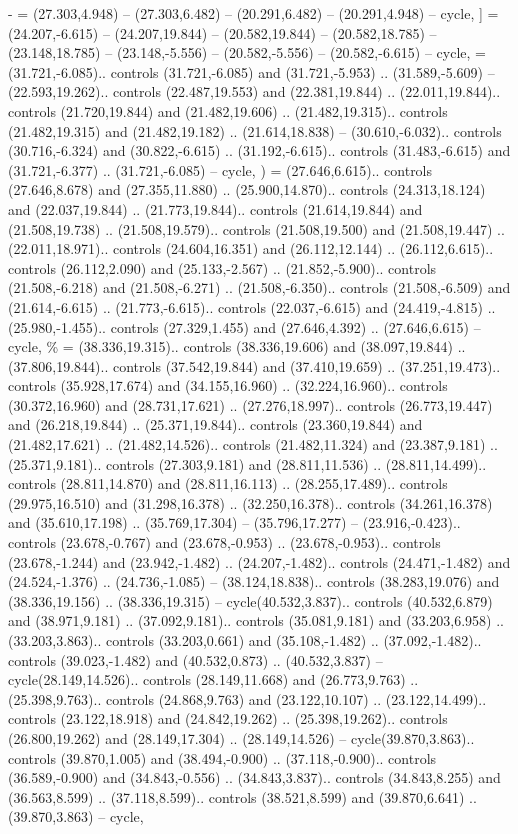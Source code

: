 {-} = {(27.303,4.948) -- (27.303,6.482) -- (20.291,6.482) -- (20.291,4.948) -- cycle},
{]} = {(24.207,-6.615) -- (24.207,19.844) -- (20.582,19.844) -- (20.582,18.785) -- (23.148,18.785) -- (23.148,-5.556) -- (20.582,-5.556) -- (20.582,-6.615) -- cycle},
{\ctpbackslash} = {(31.721,-6.085).. controls (31.721,-6.085) and (31.721,-5.953) .. (31.589,-5.609) -- (22.593,19.262).. controls (22.487,19.553) and (22.381,19.844) .. (22.011,19.844).. controls (21.720,19.844) and (21.482,19.606) .. (21.482,19.315).. controls (21.482,19.315) and (21.482,19.182) .. (21.614,18.838) -- (30.610,-6.032).. controls (30.716,-6.324) and (30.822,-6.615) .. (31.192,-6.615).. controls (31.483,-6.615) and (31.721,-6.377) .. (31.721,-6.085) -- cycle},
{)} = {(27.646,6.615).. controls (27.646,8.678) and (27.355,11.880) .. (25.900,14.870).. controls (24.313,18.124) and (22.037,19.844) .. (21.773,19.844).. controls (21.614,19.844) and (21.508,19.738) .. (21.508,19.579).. controls (21.508,19.500) and (21.508,19.447) .. (22.011,18.971).. controls (24.604,16.351) and (26.112,12.144) .. (26.112,6.615).. controls (26.112,2.090) and (25.133,-2.567) .. (21.852,-5.900).. controls (21.508,-6.218) and (21.508,-6.271) .. (21.508,-6.350).. controls (21.508,-6.509) and (21.614,-6.615) .. (21.773,-6.615).. controls (22.037,-6.615) and (24.419,-4.815) .. (25.980,-1.455).. controls (27.329,1.455) and (27.646,4.392) .. (27.646,6.615) -- cycle},
{\%} = {(38.336,19.315).. controls (38.336,19.606) and (38.097,19.844) .. (37.806,19.844).. controls (37.542,19.844) and (37.410,19.659) .. (37.251,19.473).. controls (35.928,17.674) and (34.155,16.960) .. (32.224,16.960).. controls (30.372,16.960) and (28.731,17.621) .. (27.276,18.997).. controls (26.773,19.447) and (26.218,19.844) .. (25.371,19.844).. controls (23.360,19.844) and (21.482,17.621) .. (21.482,14.526).. controls (21.482,11.324) and (23.387,9.181) .. (25.371,9.181).. controls (27.303,9.181) and (28.811,11.536) .. (28.811,14.499).. controls (28.811,14.870) and (28.811,16.113) .. (28.255,17.489).. controls (29.975,16.510) and (31.298,16.378) .. (32.250,16.378).. controls (34.261,16.378) and (35.610,17.198) .. (35.769,17.304) -- (35.796,17.277) -- (23.916,-0.423).. controls (23.678,-0.767) and (23.678,-0.953) .. (23.678,-0.953).. controls (23.678,-1.244) and (23.942,-1.482) .. (24.207,-1.482).. controls (24.471,-1.482) and (24.524,-1.376) .. (24.736,-1.085) -- (38.124,18.838).. controls (38.283,19.076) and (38.336,19.156) .. (38.336,19.315) -- cycle(40.532,3.837).. controls (40.532,6.879) and (38.971,9.181) .. (37.092,9.181).. controls (35.081,9.181) and (33.203,6.958) .. (33.203,3.863).. controls (33.203,0.661) and (35.108,-1.482) .. (37.092,-1.482).. controls (39.023,-1.482) and (40.532,0.873) .. (40.532,3.837) -- cycle(28.149,14.526).. controls (28.149,11.668) and (26.773,9.763) .. (25.398,9.763).. controls (24.868,9.763) and (23.122,10.107) .. (23.122,14.499).. controls (23.122,18.918) and (24.842,19.262) .. (25.398,19.262).. controls (26.800,19.262) and (28.149,17.304) .. (28.149,14.526) -- cycle(39.870,3.863).. controls (39.870,1.005) and (38.494,-0.900) .. (37.118,-0.900).. controls (36.589,-0.900) and (34.843,-0.556) .. (34.843,3.837).. controls (34.843,8.255) and (36.563,8.599) .. (37.118,8.599).. controls (38.521,8.599) and (39.870,6.641) .. (39.870,3.863) -- cycle},
